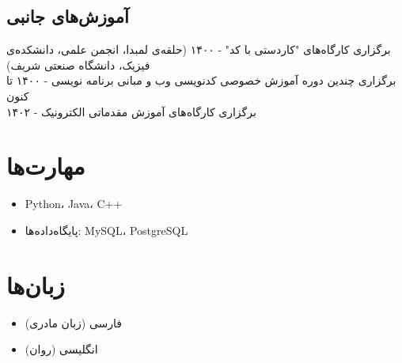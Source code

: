 \documentclass{persian-resume}
\begin{document}
\subsection*{
    آموزش‌های جانبی
}

برگزاری کارگاه‌های "کاردستی با کد" - ۱۴۰۰ (حلقه‌ی لمبدا، انجمن علمی، دانشکده‌ی فیزیک‌، دانشگاه صنعتی شریف)\\
برگزاری چندین دوره آموزش خصوصی کدنویسی وب و مبانی برنامه نویسی - ۱۴۰۰ تا کنون\\
برگزاری کارگاه‌های آموزش مقدماتی الکترونیک - ۱۴۰۲


\section{مهارت‌ها}
\begin{itemize}
  \item Python، Java، C++
  \item پایگاه‌داده‌ها: MySQL، PostgreSQL
\end{itemize}

\section{زبان‌ها}
\begin{itemize}
  \item فارسی (زبان مادری)
  \item انگلیسی (روان)
\end{itemize}
\end{document}

